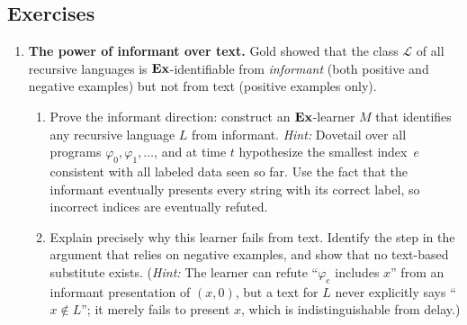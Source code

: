 
\subsection*{Exercises}

\begin{enumerate}[leftmargin=*,itemsep=6pt]

\item \textbf{The power of informant over text.}
  Gold showed that the class $\mathcal{L}$ of all recursive languages
  is $\mathbf{Ex}$-identifiable from \emph{informant} (both positive and
  negative examples) but not from text (positive examples only).
  \begin{enumerate}[label=(\alph*)]
  \item Prove the informant direction: construct an $\mathbf{Ex}$-learner $M$
    that identifies any recursive language $L$ from informant.
    \emph{Hint:}  Dovetail over all programs $\varphi_0, \varphi_1,
    \ldots$, and at time $t$ hypothesize the smallest index~$e$
    consistent with all labeled data seen so far.  Use the fact that
    the informant eventually presents every string with its correct
    label, so incorrect indices are eventually refuted.
  \item Explain precisely why this learner fails from text.  Identify
    the step in the argument that relies on negative examples, and
    show that no text-based substitute exists.  (\emph{Hint:} The
    learner can refute ``$\varphi_e$ includes $x$'' from an
    informant presentation of $(x, 0)$, but a text for $L$ never
    explicitly says ``$x \notin L$''; it merely fails to present
    $x$, which is indistinguishable from delay.)
  \end{enumerate}


\end{enumerate}
